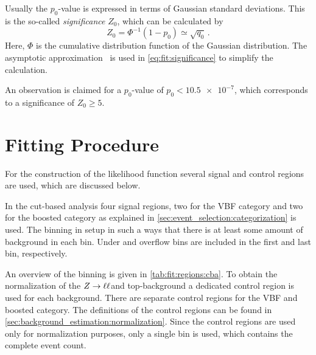 Usually the $p_0$-value is expressed in terms of Gaussian standard deviations.
This is the so-called \emph{significance} $Z_0$, which can be calculated by
\begin{equation}
    \label{eq:fit:significance}
    Z_0 = \Phi^{-1} (1 - p_0) \simeq \sqrt{q_0} \,.
\end{equation}
Here, $\Phi$ is the cumulative distribution function of the Gaussian distribution.
The asymptotic approximation~\cite{FitATLAS} is used in \cref{eq:fit:significance} to simplify the calculation.

An observation is claimed for a $p_0$-value of $p_0 < \num{10.5e-7}$, which corresponds to a significance of $Z_0 \geq 5$.

\section{Fitting Procedure}\label{sec:fit:procedure}

For the construction of the likelihood function several signal and control regions are used, which are discussed below.

In the cut-based analysis four signal regions, two for the VBF category and two for the boosted category as explained in \cref{sec:event_selection:categorization} is used.
The binning in setup in such a ways that there is at least some amount of background in each bin.
Under and overflow bins are included in the first and last bin, respectively.

An overview of the binning is given in \cref{tab:fit:regions:cba}.
To obtain the normalization of the $Z \to \ell \ell$and top-background a dedicated control region is used for each background.
There are separate control regions for the VBF and boosted category.
The definitions of the control regions can be found in \cref{sec:background_estimation:normalization}.
Since the control regions are used only for normalization purposes, only a single bin is used, which contains the complete event count.

